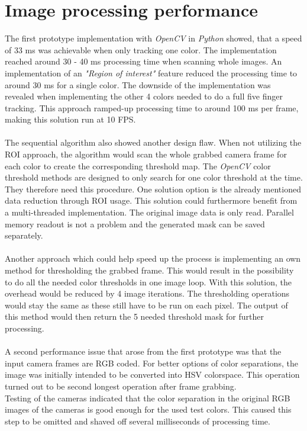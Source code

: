 \section{Image processing performance}
The first prototype implementation with \textit{OpenCV} in \textit{Python} showed, that a speed of 33 ms was achievable when only tracking one color. The implementation reached around 30 - 40 ms processing time when scanning whole images. An implementation of an \textit{"Region of interest"} feature reduced the processing time to around 30 ms for a single color. The downside of the implementation was revealed when implementing the other 4 colors needed to do a full five finger tracking. This approach ramped-up processing time to around 100 ms per frame, making this solution run at 10 FPS.\\\\ 
The sequential algorithm also showed another design flaw. When not utilizing the ROI approach, the algorithm would scan the whole grabbed camera frame for each color to create the corresponding threshold map. The \textit{OpenCV} color threshold methods are designed to only search for one color threshold at the time. They therefore need this procedure. One solution option is the already mentioned data reduction through ROI usage. This solution could furthermore benefit from a multi-threaded implementation. The original image data is only read. Parallel memory readout is not a problem and the generated mask can be saved separately.\\
\\Another approach which could help speed up the process is implementing an own method for thresholding the grabbed frame. This would result in the possibility to do all the needed color thresholds in one image loop. With this solution, the overhead would be reduced by 4 image iterations. The thresholding operations would stay the same as these still have to be run on each pixel. The output of this method would then return the 5 needed threshold mask for further processing.\\\\
A second performance issue that arose from the first prototype was that the input camera frames are RGB coded. For better options of color separations, the image was initially intended to be converted into HSV colorspace. This operation turned out to be second longest operation after frame grabbing. \\Testing of the cameras indicated that the color separation in the original RGB images of the cameras is good enough for the used test colors. This caused this step to be omitted and shaved off several milliseconds of processing time.
